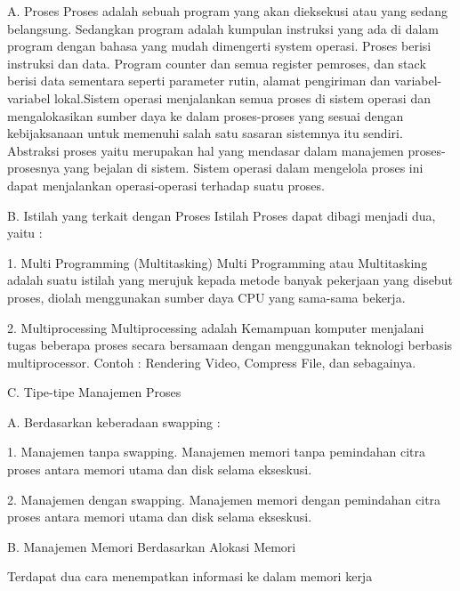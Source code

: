 A. Proses
Proses adalah sebuah program yang akan dieksekusi atau yang sedang belangsung. Sedangkan program adalah kumpulan instruksi yang ada di dalam program dengan bahasa yang mudah dimengerti system operasi. Proses berisi instruksi dan data. Program counter dan semua register pemroses, dan stack berisi data sementara seperti parameter rutin, alamat pengiriman dan variabel-variabel lokal.Sistem operasi menjalankan semua proses di sistem operasi dan mengalokasikan sumber daya ke dalam proses-proses yang sesuai dengan kebijaksanaan untuk memenuhi salah satu sasaran sistemnya itu sendiri. Abstraksi proses yaitu merupakan  hal yang mendasar dalam manajemen proses-prosesnya yang bejalan di sistem. Sistem operasi dalam mengelola proses ini dapat menjalankan operasi-operasi terhadap suatu proses.

B. Istilah yang terkait dengan Proses
Istilah Proses dapat dibagi menjadi dua, yaitu :

1. Multi Programming (Multitasking)
Multi Programming atau Multitasking adalah suatu istilah yang merujuk kepada metode banyak pekerjaan yang disebut proses, diolah menggunakan sumber daya CPU yang sama-sama bekerja.

2. Multiprocessing
Multiprocessing adalah Kemampuan komputer menjalani tugas beberapa proses secara bersamaan dengan menggunakan teknologi berbasis multiprocessor.
Contoh : Rendering Video, Compress File, dan sebagainya.


C. Tipe-tipe Manajemen Proses

A. Berdasarkan keberadaan swapping :

1. Manajemen tanpa swapping.
Manajemen memori tanpa pemindahan citra proses antara memori utama dan disk selama ekseskusi.

2. Manajemen dengan swapping.
Manajemen memori dengan pemindahan citra proses antara memori utama dan disk selama ekseskusi.

B. Manajemen Memori Berdasarkan Alokasi Memori

Terdapat dua cara menempatkan informasi ke dalam memori kerja

